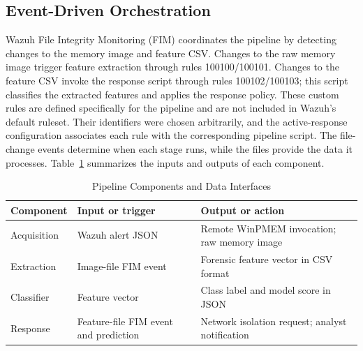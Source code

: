 \documentclass[conference]{IEEEtran}
\begin{document}
\subsection{Event-Driven Orchestration}
Wazuh File Integrity Monitoring (FIM) coordinates the pipeline by detecting changes to the memory image and feature CSV. Changes to the raw memory image trigger feature extraction through rules 100100/100101. Changes to the feature CSV invoke the response script through rules 100102/100103; this script classifies the extracted features and applies the response policy. These custom rules are defined specifically for the pipeline and are not included in Wazuh's default ruleset. Their identifiers were chosen arbitrarily, and the active-response configuration associates each rule with the corresponding pipeline script. The file-change events determine when each stage runs, while the files provide the data it processes. Table~\ref{tab:interfaces} summarizes the inputs and
outputs of each component.

\begin{table}[t]
\caption{Pipeline Components and Data Interfaces}
\label{tab:interfaces}
\centering
\footnotesize
\begin{tabular}{@{}p{1.45cm}p{2.85cm}p{3.55cm}@{}}
\toprule
Component & Input or trigger & Output or action \\
\midrule
Acquisition & Wazuh alert JSON & Remote WinPMEM invocation; raw memory image \\
Extraction & Image-file FIM event & Forensic feature vector in CSV format \\
Classifier & Feature vector & Class label and model score in JSON \\
Response & Feature-file FIM event and prediction & Network isolation request; analyst notification \\
\bottomrule
\end{tabular}
\end{table}


\end{document}
